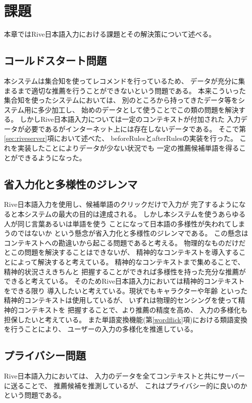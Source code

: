 \chapter{課題}
\label{chap:discussion}
本章ではRive日本語入力における課題とその解決策について述べる。

\newpage
\section{コールドスタート問題}
本システムは集合知を使ってレコメンドを行っているため、
データが充分に集まるまで適切な推薦を行うことができないという問題である。
本来こういった集合知を使ったシステムにおいては、
別のところから持ってきたデータ等をシステム用に多少加工し、
始めのデータとして使うことでこの類の問題を解決する。
しかしRive日本語入力については一定のコンテキストが付加された
入力データが必要であるがインターネット上には存在しないデータである。
そこで第\ref{sec:riveserver}項において述べた、
beforeRulesとafterRulesの実装を行った。
これを実装したことによりデータが少ない状況でも
一定の推薦候補単語を得ることができるようになった。

\section{省入力化と多様性のジレンマ}
Rive日本語入力を使用し、候補単語のクリックだけで入力が
完了するようになると本システムの最大の目的は達成される。
しかし本システムを使うあらゆる人が同じ言葉あるいは単語を使う
ことになって日本語の多様性が失われてしまうのではないか
という懸念が省入力化と多様性のジレンマである。
この懸念はコンテキストへの勘違いから起こる問題であると考える。
物理的なものだけだとこの問題を解決することはできないが、
精神的なコンテキストを導入することによって解決すると考えている。
精神的なコンテキストまで集めることで、精神的状況さえきちんと
把握することができれば多様性を持った充分な推薦ができると考えている。
そのためRive日本語入力においては精神的コンテキストをできる限り
導入したいと考えている。現状でもキャラクターや年齢
といった精神的コンテキストは使用しているが、
いずれは物理的センシングを使って精神的コンテキストを
把握することで、より推薦の精度を高め、
入力の多様化も担保したいと考えている。
また単語変換機能(第\ref{wordflick}項)における類語変換
を行うことにより、
ユーザーの入力の多様化を推進している。

\section{プライバシー問題}
Rive日本語入力においては、
入力のデータを全てコンテキストと共にサーバーに送ることで、
推薦候補を推測しているが、
これはプライバシー的に良いのかという問題である。

